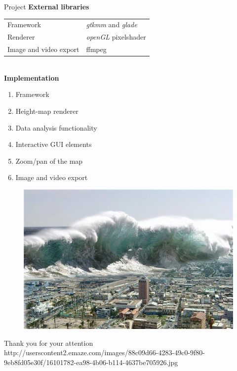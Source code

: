 \documentclass[shortpres,usenames,dvipsnames]{beamer}
\newcommand{\imgfullscale}{0.75}
\begin{document}
\begin{frame}{Project}
	\textbf{External libraries}\\\vspace{5pt}
	\begin{tabular}{ll}
		Framework & \textit{gtkmm} and \textit{glade}\\
		Renderer & \textit{openGL} pixelshader\\
		Image and video export & ffmpeg
	\end{tabular}
	\\\vspace{15pt}
	\textbf{Implementation}
	\begin{enumerate}
		\item Framework
		\item Height-map renderer
		\item Data analysis functionality
		\item Interactive GUI elements
		\item Zoom/pan of the map
		\item Image and video export
	\end{enumerate}
\end{frame}

\begin{frame}{}
	\begin{figure}
		\includegraphics[clip, width=\imgfullscale\linewidth]{img/tsunami.jpg}
	\end{figure}
	\centering
	Thank you for your attention
	\\
	\vfill
	\flushleft
	{\fontsize{5}{5} \selectfont http://userscontent2.emaze.com/images/88c09d66-4283-49c0-9f80-9eb8fd05e30f/16101782-ea98-4b06-b114-4637be705926.jpg}
\end{frame}
	
\end{document}

